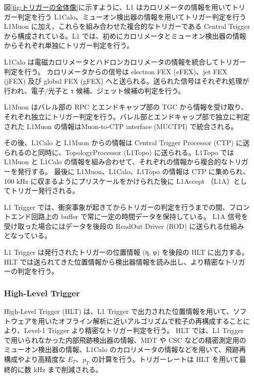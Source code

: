 図\ref{fig:トリガーの全体像}に示すように、L1 はカロリメータの情報を用いてトリガー判定を行う L1Calo、ミューオン検出器の情報を用いてトリガー判定を行う L1Muon に加え、これらを組み合わせた複合的なトリガーである Central Trigger から構成されている。L1 では、初めにカロリメータとミューオン検出器の情報からそれぞれ単独にトリガー判定を行う。

L1Calo は電磁カロリメータとハドロンカロリメータの情報を統合してトリガー判定を行う。
カロリメータからの信号は electron FEX (eFEX)、jet FEX (jFEX) 及び global FEX (gFEX) へと送られる。送られた信号はそれぞれ処理が行われ、電子/光子と τ 候補、ジェット候補の判定を行う。

L1Muon はバレル部の RPC とエンドキャップ部の TGC から情報を受け取り、それぞれ独立にトリガー判定を行う。バレル部とエンドキャップ部で独立に判定された L1Muon の情報はMuon-to-CTP interface (MUCTPI) で統合される。

その後、L1Calo と L1Muon からの情報は Central Trigger Processor (CTP) に送られるのと同時に、TopologyProcessor (L1Topo) に送られる。L1Topo では L1Muon と L1Calo の情報を組み合わせて、それぞれの情報から複合的なトリガーを発行する。
最後に L1Muon、L1Calo、L1Topo の情報は CTP に集められ、100 kHz に収まるようにプリスケールをかけられた後に L1Accept （L1A）としてトリガー発行される。

L1 Trigger では、衝突事象が起きてからトリガーの判定を行うまでの間、フロントエンド回路上の buffer で常に一定の時間データを保持している。
L1A 信号を受け取った場合にはデータを後段の ReadOut Driver (ROD) に送られる仕組みとなっている。

L1 Trigger は発行されたトリガーの位置情報 (η, φ) を後段の HLT に出力する。HLT では送られてきた位置情報から検出器情報を読み出し、より精密なトリガーの判定を行う。

\subsubsection{High-Level Trigger}
High-Level Trigger (HLT) は、L1 Trigger で出力された位置情報を用いて、ソフトウェアを用いたオフライン解析に近いアルゴリズムで粒子の再構成することにより、Level-1 Trigger より精密なトリガー判定を行う。
HLT では、L1 Trigger で用いられなかった内部飛跡検出器の情報、MDT や CSC などの精密測定用のミューオン検出器の情報、L1Calo のカロリメータの情報などを用いて、飛跡再構成やより高精度な $E_T$、$p_T$ の計算を行う。トリガーレートは HLT を用いて最終的に数 kHz まで削減される。






